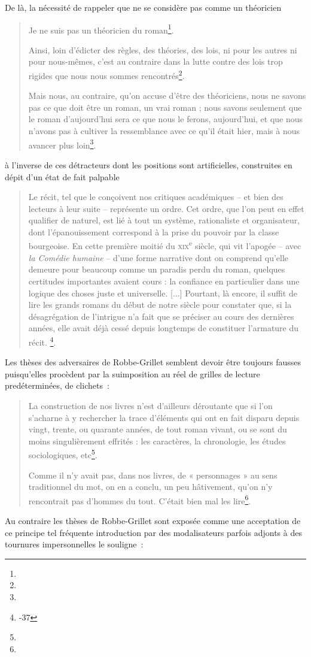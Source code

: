 \documentclass[12pt, a4paper]{article}
\begin{document}
De là, la nécessité de rappeler que \robbe{} ne se considère pas comme un théoricien
\begin{quote}
    Je ne suis pas un théoricien du roman\footnote{}.


    Ainsi, loin d’édicter des règles, des théories, des lois, ni pour les autres ni pour nous-mêmes, c’est au contraire dans la lutte contre des lois trop rigides que nous nous sommes rencontrés\footnote{}.

    Mais nous, au contraire, qu’on accuse d’être des théoriciens, nous ne savons pas ce que doit être un roman, un vrai roman ; nous savons seulement que le roman d’aujourd’hui sera ce que nous le ferons, aujourd’hui, et que nous n’avons pas à cultiver la ressemblance avec ce qu’il était hier, mais à nous avancer plus loin\footnote{}.
\end{quote}
à l'inverse de ces détracteurs dont les positions sont artificielles, construites en dépit d'un état de fait palpable
\begin{quote}
    Le récit, tel que le conçoivent nos critiques académiques – et bien des lecteurs à leur suite – représente un ordre. Cet ordre, que l’on peut en effet qualifier de naturel, est lié à tout un système, rationaliste et organisateur, dont l’épanouissement correspond à la prise du pouvoir par la classe bourgeoise. En cette première moitié du \textsc{xix}\textsuperscript{e} siècle, qui vit l’apogée – avec \textit{la Comédie humaine} – d’une forme narrative dont on comprend qu’elle demeure pour beaucoup comme un paradis perdu du roman, quelques certitudes importantes avaient cours : la confiance en particulier dans une logique des choses juste et universelle.
    [...]
    Pourtant, là encore, il suffit de lire les grands romans du début de notre siècle pour constater que, si la désagrégation de l’intrigue n’a fait que se préciser au cours des dernières années, elle avait déjà cessé depuis longtemps de constituer l’armature du récit.
    \footnote{-37}.
\end{quote}
Les thèses des adversaires de Robbe-Grillet semblent devoir être toujours fausses puisqu'elles procèdent par la suimposition au réel de grilles de lecture predéterminées, de clichets~:
\begin{quote}
    La construction de nos livres n’est d’ailleurs déroutante que si l’on s’acharne à y rechercher la trace d’éléments qui ont en fait disparu depuis vingt, trente, ou quarante années, de tout roman vivant, ou se sont du moins singulièrement effrités : les caractères, la chronologie, les études sociologiques, etc\footnote{}.

    Comme il n’y avait pas, dans nos livres, de « personnages » au sens traditionnel du mot, on en a conclu, un peu hâtivement, qu’on n’y rencontrait pas d’hommes du tout. C’était bien mal les lire\footnote{}.
\end{quote}
Au contraire les thèses de Robbe-Grillet sont exposée comme une acceptation de ce principe tel  fréquente introduction par des modalisateurs parfois adjonts à des tournures impersonnelles le souligne~:
\end{document}
